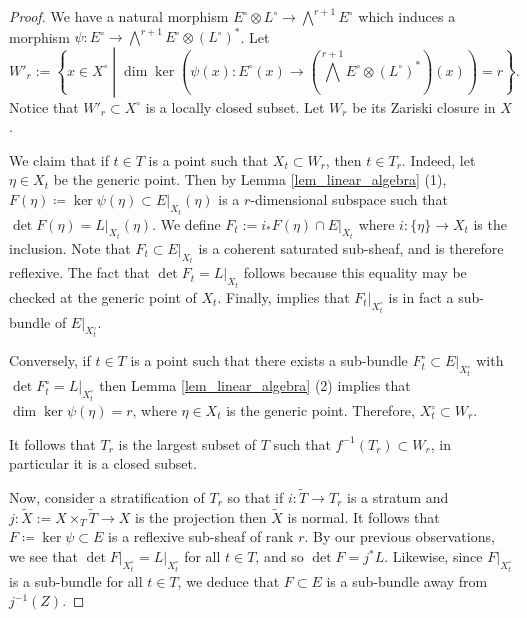 \documentclass[12pt]{amsart}
\numberwithin{equation}{section}
\theoremstyle{definition}
\theoremstyle{definition}
\theoremstyle{definition}
\begin{document}
\begin{proof}
We have a natural morphism $E^\circ \otimes L^\circ \to \bigwedge^{r+1}E^\circ$
which induces a morphism 
$\psi\colon E^\circ \to \bigwedge^{r+1}E^\circ \otimes (L^\circ)^*$.  Let 
\[W'_r :=\left\{ x \in X^\circ \middle| \dim \ker\left(\psi(x) \colon E^\circ(x) \to \left(\bigwedge^{r+1}E^\circ \otimes (L^\circ)^*\right)(x)\right) = r\right\}.\]
Notice that $W'_r \subset X^\circ$ is a locally closed subset. Let $W_r$ be its Zariski closure in $X$.

We claim that if $t \in T$ is a point such that $X_t \subset W_r$, then $t\in T_r$.
Indeed, let $\eta \in X_t$ be the generic point.  Then by Lemma \ref{lem_linear_algebra} (1), 
$F(\eta)\coloneqq \ker \psi(\eta) \subset E\vert_{X_t}(\eta)$
is a  $r$-dimensional subspace such that $\det F(\eta) = L\vert_{X_t}(\eta)$.  We define $F_t:=i_*F(\eta) \cap E\vert_{X_t}$ where 
$i\colon \{\eta\} \to X_t$ is the inclusion.
Note that $F_t \subset E\vert_{X_t}$ is a coherent saturated sub-sheaf, and is therefore reflexive.  
The fact that 
$\det F_t = L\vert_{X_t}$ 
follows because this equality may be checked at the generic point
of $X_t$.  
Finally, 
\cite[Lemma 1.20]{DPS94} implies that $F_t\vert_{X^\circ_t}$ is in fact a sub-bundle of $E\vert_{X^\circ_t}$.


Conversely, if $t \in T$ is a point such that there exists a sub-bundle $F^\circ_t \subset  E\vert_{X^\circ_t}$ with $\det F^\circ_t = L\vert_{X^\circ_t}$
then Lemma \ref{lem_linear_algebra} (2) implies that $\dim \ker \psi(\eta) = r$, where $\eta \in X_t$ is the generic point. Therefore, $X^\circ_t \subset W_r$.

It follows that $T_r$ is the largest subset of $T$ such that $f^{-1}(T_r) \subset W_r$, in particular it is a closed subset.

Now, consider a stratification of $T_r$ so that if $i\colon \tilde{T} \to T_r$ is a stratum and
$j\colon \tilde{X} := X\times_T\tilde{T}\to X$ is the projection then $\tilde X$ is normal.
It follows that  $F\coloneqq \ker \psi \subset E$ is a reflexive sub-sheaf of rank $r$.
By our previous observations, we see that $\det F\vert_{X^\circ_t} = L\vert_{X^\circ_t}$ for all $t \in T$, and so $\det F = j^*L$.  Likewise, since $F\vert_{X^\circ_t}$ 
is a sub-bundle for all $t \in T$, we deduce that $F \subset E$ is a sub-bundle away from $j^{-1}(Z)$.
\end{proof}
\end{document}

